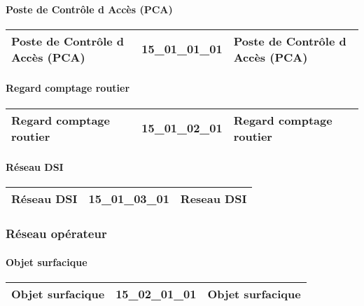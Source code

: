 \documentclass[12pt,titlepage]{book}
\begin{document}
\paragraph{Poste de Contrôle d Accès (PCA)}
\noindent
\vspace{\baselineskip}

\renewcommand{\arraystretch}{1.2}
\begin{supertabular}{|p{10cm}|c|p{15cm}|}
 Poste de Contrôle d Accès (PCA) & 15\_01\_01\_01 & Poste de Contrôle d Accès (PCA)\\
\hline
\end{supertabular}


\paragraph{Regard comptage routier}
\noindent
\vspace{\baselineskip}

\renewcommand{\arraystretch}{1.2}
\begin{supertabular}{|p{10cm}|c|p{15cm}|}
 Regard comptage routier & 15\_01\_02\_01 & Regard comptage routier\\
\hline
\end{supertabular}


\paragraph{Réseau DSI}
\noindent
\vspace{\baselineskip}

\renewcommand{\arraystretch}{1.2}
\begin{supertabular}{|p{10cm}|c|p{15cm}|}
 Réseau DSI & 15\_01\_03\_01 & Reseau DSI\\
\hline
\end{supertabular}

\subsubsection{\large Réseau opérateur}
\paragraph{Objet surfacique}
\noindent
\vspace{\baselineskip}

\renewcommand{\arraystretch}{1.2}
\begin{supertabular}{|p{10cm}|c|p{15cm}|}
 Objet surfacique & 15\_02\_01\_01 & Objet surfacique\\
\hline
\end{supertabular}
\end{document}
